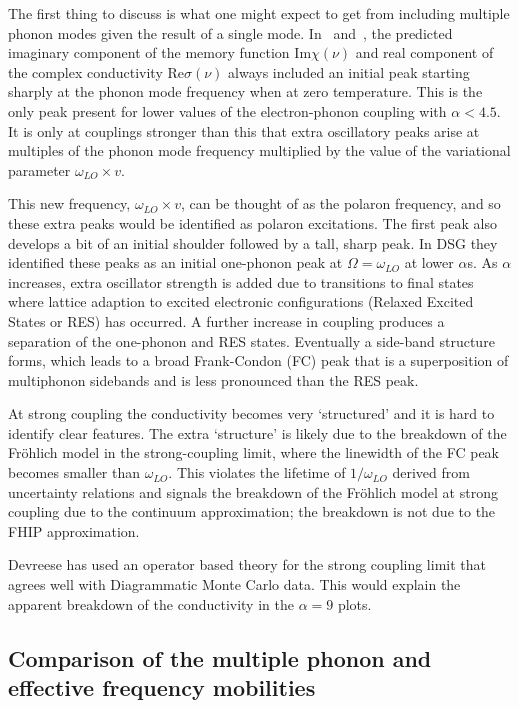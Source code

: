 The first thing to discuss is what one might expect to get from including multiple phonon modes given the result of a single mode. In~\cite{feynman_mobility_1962} and~\cite{devreese_optical_1972}, the predicted imaginary component of the memory function $\text{Im}\chi(\nu)$ and real component of the complex conductivity $\text{Re}\sigma(\nu)$ always included an initial peak starting sharply at the phonon mode frequency when at zero temperature. This is the only peak present for lower values of the electron-phonon coupling with $\alpha < 4.5$. It is only at couplings stronger than this that extra oscillatory peaks arise at multiples of the phonon mode frequency multiplied by the value of the variational parameter $\omega_{LO} \times v$. 

This new frequency, $\omega_{LO} \times v$, can be thought of as the polaron frequency, and so these extra peaks would be identified as polaron excitations. The first peak also develops a bit of an initial shoulder followed by a tall, sharp peak. In DSG they identified these peaks as an initial one-phonon peak at $\Omega = \omega_{LO}$ at lower $\alpha$s. As $\alpha$ increases, extra oscillator strength is added due to transitions to final states where lattice adaption to excited electronic configurations (Relaxed Excited States or RES) has occurred. A further increase in coupling produces a separation of the one-phonon and RES states. Eventually a side-band structure forms, which leads to a broad Frank-Condon (FC) peak that is a superposition of multiphonon sidebands and is less pronounced than the RES peak. 

At strong coupling the conductivity becomes very `structured' and it is hard to identify clear features. The extra `structure' is likely due to the breakdown of the Fr\"ohlich model in the strong-coupling limit, where the linewidth of the FC peak becomes smaller than $\omega_{LO}$. This violates the lifetime of $1 / \omega_{LO}$ derived from uncertainty relations and signals the breakdown of the Fr\"ohlich model at strong coupling due to the continuum approximation; the breakdown is not due to the FHIP approximation. 

Devreese has used an operator based theory \cite{Devreese2001} for the strong coupling limit that agrees well with Diagrammatic Monte Carlo data. This would explain the apparent breakdown of the conductivity in the $\alpha = 9$ plots. 

\subsection{Comparison of the multiple phonon and effective frequency mobilities}

